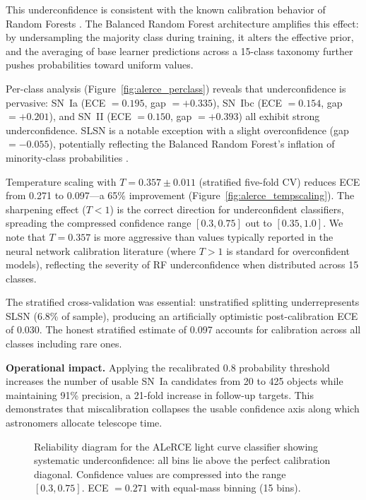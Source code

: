 \documentclass[twocolumn]{aastex631}
\begin{document}
This underconfidence is consistent with the known calibration behavior of Random Forests \citep{niculescumizil2005, bostrom2008}. The Balanced Random Forest architecture amplifies this effect: by undersampling the majority class during training, it alters the effective prior, and the averaging of base learner predictions across a 15-class taxonomy further pushes probabilities toward uniform values.

Per-class analysis (Figure~\ref{fig:alerce_perclass}) reveals that underconfidence is pervasive: SN~Ia (ECE $= 0.195$, gap $= +0.335$), SN~Ibc (ECE $= 0.154$, gap $= +0.201$), and SN~II (ECE $= 0.150$, gap $= +0.393$) all exhibit strong underconfidence. SLSN is a notable exception with a slight overconfidence (gap $= -0.055$), potentially reflecting the Balanced Random Forest's inflation of minority-class probabilities \citep{vandengoorbergh2022}.

Temperature scaling with $T = 0.357 \pm 0.011$ (stratified five-fold CV) reduces ECE from 0.271 to 0.097---a 65\% improvement (Figure~\ref{fig:alerce_tempscaling}). The sharpening effect ($T < 1$) is the correct direction for underconfident classifiers, spreading the compressed confidence range $[0.3, 0.75]$ out to $[0.35, 1.0]$. We note that $T = 0.357$ is more aggressive than values typically reported in the neural network calibration literature (where $T > 1$ is standard for overconfident models), reflecting the severity of RF underconfidence when distributed across 15 classes.

The stratified cross-validation was essential: unstratified splitting underrepresents SLSN (6.8\% of sample), producing an artificially optimistic post-calibration ECE of 0.030. The honest stratified estimate of 0.097 accounts for calibration across all classes including rare ones.

\textbf{Operational impact.} Applying the recalibrated 0.8 probability threshold increases the number of usable SN~Ia candidates from 20 to 425 objects while maintaining 91\% precision, a 21-fold increase in follow-up targets. This demonstrates that miscalibration collapses the usable confidence axis along which astronomers allocate telescope time.

\begin{figure}
\caption{Reliability diagram for the ALeRCE light curve classifier showing systematic underconfidence: all bins lie above the perfect calibration diagonal. Confidence values are compressed into the range $[0.3, 0.75]$. ECE $= 0.271$ with equal-mass binning (15 bins). \label{fig:alerce_reliability}}
\end{figure}
\end{document}
